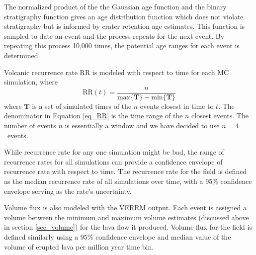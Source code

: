 \documentclass[12pt,letter]{article}
\begin{document}
The normalized product of the the Gaussian age function and the binary stratigraphy function gives an age distribution function which does not violate stratigraphy but is informed by crater retention age estimates. This function is sampled to date an event and the process repeats for the next event. By repeating this process 10,000 times, the potential age ranges for each event is determined.

Volcanic recurrence rate $\text{RR}$ is modeled with respect to time for each MC simulation, where 
\begin{equation}
\text{RR}(t) = \frac{n}{\text{max}\{\mathbf{T}\} - \text{min}\{\mathbf{T}\}}
\label{eq_RR}
\end{equation}
where $\mathbf{T}$ is a set of simulated times of the $n$ events closest in time to $t$. The denominator in Equation \ref{eq_RR} is the time range of the $n$ closest events. The number of events $n$ is essentially a window and we have decided to use $n=4$~events.

While recurrence rate for any one simulation might be bad, the range of recurrence rates for all simulations can provide a confidence envelope of recurrence rate with respect to time. The recurrence rate for the field is defined as the median recurrence rate of all simulations over time, with a 95\% confidence envelope serving as the rate's uncertainty.

Volume flux is also modeled with the VERRM output. Each event is assigned a volume between the minimum and maximum volume estimates (discussed above in section \ref{sec_volume}) for the lava flow it produced. Volume flux for the field is defined similarly using a 95\% confidence envelope and median value of the volume of erupted lava per million year time bin.
\end{document}
